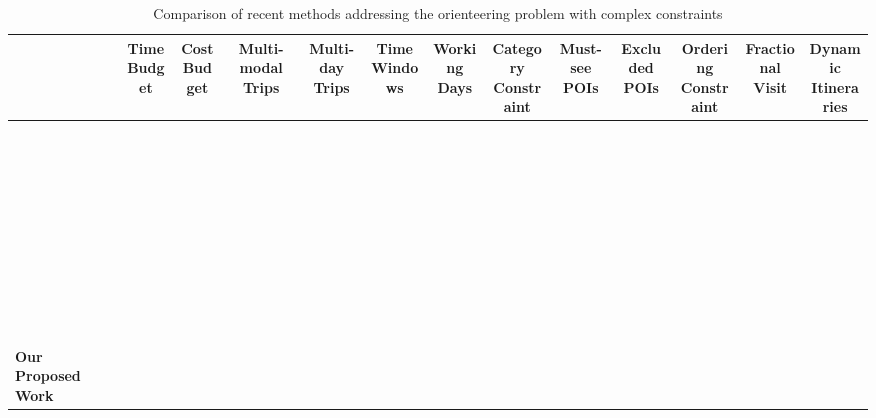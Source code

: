\documentclass[sigconf,authordraft]{acmart}
\newcommand{\cmark}{\ding{51}} %
\begin{document}
\begin{table}[htbp]
\centering
\caption{Comparison of recent methods addressing the orienteering problem with complex constraints}
\begin{adjustbox}{width=0.95\textwidth,center}
\begin{tabular}{lcccccccccccc}
\toprule
& \makecell{Time\\Budget} 
& \makecell{Cost\\Budget} 
& \makecell{Multi-modal\\Trips}
& \makecell{Multi-day\\Trips} 
& \makecell{Time\\Windows} 
& \makecell{Working\\Days}  
& \makecell{Category\\Constraint} 
& \makecell{Must-see\\POIs}  
& \makecell{Excluded\\POIs} 
& \makecell{Ordering\\Constraint}
& \makecell{Fractional\\Visit} 
& \makecell{Dynamic\\Itineraries}\\
\midrule
~\cite{chen2014automatic}      & \cmark &   &   & \cmark &   &   &   & \cmark &   &   &   &   \\
\midrule
~\cite{vanzelst2016itinerary}  &   & \cmark &   & \cmark & \cmark &   & \cmark &   &   &   &   &   \\
\midrule
~\cite{taylor2018tour}         & \cmark &   &   &   &   &   &   & \cmark &   &   &   &   \\
\midrule
~\cite{vu2022branch}           & \cmark & \cmark &   &   & \cmark &   & \cmark & \cmark & \cmark & \cmark &   &   \\
\midrule
~\cite{panagiotakis2024expectation}          & \cmark &   &   &   &   &   & \cmark & \cmark &   & \cmark &   &   \\
\midrule
~\cite{liu2024personalized}    & \cmark &   &   & \cmark & \cmark &   & \cmark & \cmark &   &   &   &   \\
\midrule
~\cite{rambha2024optimized}    &  & \cmark  &   &  \cmark  & \cmark  & \cmark   &  &  &   &   &   &   \\
\midrule
~\cite{lim2018personalized}    & \cmark & \cmark  &   &   & \cmark  &   & \cmark & \cmark &   &   &   &   \\
\midrule
~\cite{bolzoni2014efficient}    & \cmark &   &   &    &  &   & \cmark &  &   &   & \cmark  &   \\
\midrule
\textbf{Our Proposed Work}             & \cmark & \cmark & \cmark & \cmark & \cmark & \cmark & \cmark & \cmark & \cmark & \cmark & \cmark & \cmark \\
\bottomrule
\end{tabular}
\end{adjustbox}
\end{table}
\end{document}
